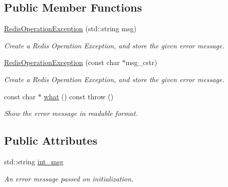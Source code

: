 \subsection*{Public Member Functions}
\begin{DoxyCompactItemize}
\item 
\hypertarget{structRedisOperationException_a54e07b6a7c4d81ab0cb4d1f61d5a6226}{\hyperlink{structRedisOperationException_a54e07b6a7c4d81ab0cb4d1f61d5a6226}{Redis\-Operation\-Exception} (std\-::string msg)}\label{structRedisOperationException_a54e07b6a7c4d81ab0cb4d1f61d5a6226}

\begin{DoxyCompactList}\small\item\em Create a Redis Operation Exception, and store the given error message. \end{DoxyCompactList}\item 
\hypertarget{structRedisOperationException_a330513962eb439159cf494f3996edc8c}{\hyperlink{structRedisOperationException_a330513962eb439159cf494f3996edc8c}{Redis\-Operation\-Exception} (const char $\ast$msg\-\_\-cstr)}\label{structRedisOperationException_a330513962eb439159cf494f3996edc8c}

\begin{DoxyCompactList}\small\item\em Create a Redis Operation Exception, and store the given error message. \end{DoxyCompactList}\item 
\hypertarget{structRedisOperationException_a629e013517496f9e14ae5286a8759043}{const char $\ast$ \hyperlink{structRedisOperationException_a629e013517496f9e14ae5286a8759043}{what} () const   throw ()}\label{structRedisOperationException_a629e013517496f9e14ae5286a8759043}

\begin{DoxyCompactList}\small\item\em Show the error message in readable format. \end{DoxyCompactList}\end{DoxyCompactItemize}
\subsection*{Public Attributes}
\begin{DoxyCompactItemize}
\item 
\hypertarget{structRedisOperationException_ac5deeab2028bb95e7db928cfb222656e}{std\-::string \hyperlink{structRedisOperationException_ac5deeab2028bb95e7db928cfb222656e}{int\-\_\-msg}}\label{structRedisOperationException_ac5deeab2028bb95e7db928cfb222656e}

\begin{DoxyCompactList}\small\item\em An error message passed on initialization. \end{DoxyCompactList}\end{DoxyCompactItemize}


